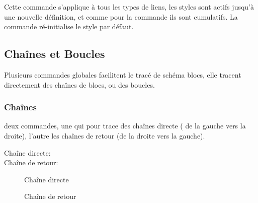 \documentclass[a4paper,11pt]{article}                      %
\begin{document}
Cette commande s'applique à tous les types de liens, les styles sont actifs jusqu'à une nouvelle définition, et comme pour la commande   ils sont cumulatifs. La commande \myverb{\sbStyleLienDefaut} ré-initialise le style par défaut.

\subsection{Chaînes et Boucles}

Plusieurs commandes globales facilitent le tracé de schéma blocs, elle tracent directement des chaînes de blocs, ou des boucles.

\subsubsection{Chaînes}
deux commandes, une qui pour trace des chaînes directe ( de la gauche vers la droite), l'autre les chaînes de retour (de la droite vers la gauche).

  
\begin{description}
\item [Chaîne directe:] 
\item [Chaîne de retour: ] 
\end{description}

 \begin{figure}[!htb]
\centering
\begin{tikzexampleL}[title=,]
\end{tikzexampleL}
\caption{Chaîne directe}
\label{fig:chainedirecte}
\end{figure}



\begin{figure}[!htb]
\centering
\begin{tikzexampleL}[title=,]
\end{tikzexampleL}
\caption{Chaîne de retour}
\label{fig:chaineretoure}
\end{figure}
\end{document}

